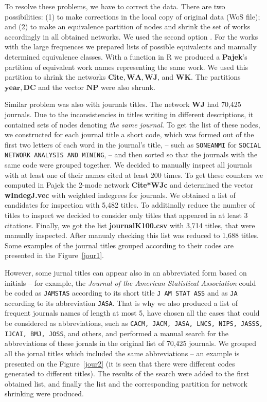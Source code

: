 \documentclass[11pt]{article} %
\begin{document}
To resolve these problems, we have to correct the data. There are two possibilities: (1) to make corrections in the local copy of original data (WoS file); and (2) to make an equivalence partition of nodes and shrink the set of works accordingly in all  obtained networks. We used the second option \citep{Understand}. For the works with the large frequences we prepared lists of possible equivalents and manually determined equivalence classes. With a function in R we produced a \textbf{Pajek}'s partition of equivalent work names representing the same work. We used this partition to shrink the networks $\mathbf{Cite, WA, WJ}$, and $\mathbf{WK}$. The partitions $\mathbf{year,  DC}$ and the vector $\mathbf{NP}$ were also shrunk.  \medskip 

Similar problem was also with journals titles. The network \textbf{WJ} had 70,425 journals. Due to the inconsistencies in titles writing in different descriptions, it contained sets of nodes denoting \textit{the same journal}. To get the list of these nodes, we constructed for each journal title a short code, which was formed out of the first two letters of each word in the journal's title, -- such as \texttt{SONEANMI} for \texttt{SOCIAL NETWORK ANALYSIS AND MINING}, -- and then sorted so that the journals with the same code were grouped together. We decided to manually inspect all journals with at least one of their names cited at least 200 times. To get these counters we computed in Pajek the 2-mode network \textbf{Cite*WJc} and determined the vector \textbf{wIndegJ.vec} with weighted indegrees for journals. We obtained a list of candidates for inspection with 5,482 titles. To additinally reduce the number of titles to inspect we decided to consider only titles that appeared in at least 3 citations. Finally, we got the list \textbf{journalK100.csv} with 3,714 titles, that were manually inspected. After manualy checking this list was reduced to 1,688 titles. Some examples of the journal titles grouped according to their codes are presented in the Figure~\ref{jour1}.\medskip 

However, some jurnal titles can appear also in an abbreviated form based on initials -- for example, the \textit{Journal of the American Statistical Association} could be coded as \texttt{JAMSTAS} according to its short title \texttt{J AM  STAT ASS} and as \texttt{JA} according to its abbreviation \texttt{JASA}. That is why we also produced a list of frequent journals names of length at most 5, have chosen all the cases that could be considered as abbreviations, such as \texttt{CACM, JACM, JASA, LNCS, NIPS, JASSS, IJCAI, BMJ, JOSS}, and others, and performed a manual search for the abbreviations of these jornals in the original list of 70,425 journals. We grouped all the jornal titles which included the same abbreviations -- an example  is presented on the Figure~\ref{jour2} (it is seen that there were different codes generated to different titles). The results of the search were added to the first obtained list, and finally the list and the corresponding partition for network shrinking were produced.  \medskip 
\end{document}

